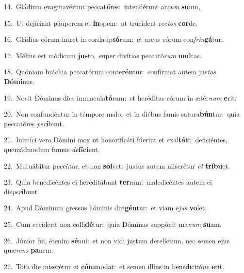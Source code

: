 {\numbfont\textcolor{\numbcolor}{14.}}~Gládium evaginavérunt pecca\-\textbf{tó}\-res:~\star intendérunt ar\textit{cum} \textbf{su}\-um,\par
{\numbfont\textcolor{\numbcolor}{15.}}~Ut dejíciant páuperem et \textbf{ín}\-opem:~\star ut trucídent rec\textit{tos} \textbf{cor}\-de.\par
{\numbfont\textcolor{\numbcolor}{16.}}~Gládius eórum intret in corda ip\-\textbf{só}\-rum:~\star et arcus eórum con\-\textit{frin}\-\textbf{gá}tur.\par
{\numbfont\textcolor{\numbcolor}{17.}}~Mélius est módicum \textbf{jus}\-to,~\star super divítias peccató\textit{rum} \textbf{mul}\-tas.\par
{\numbfont\textcolor{\numbcolor}{18.}}~Quóniam bráchia peccatórum conte\-\textbf{rén}\-tur:~\star confírmat autem jus\textit{tos} \textbf{Dó}\-\textbf{mi}nus.\par
{\numbfont\textcolor{\numbcolor}{19.}}~Novit Dóminus dies immacula\-\textbf{tó}\-rum:~\star et heréditas eórum in ætér\textit{num} \textbf{e}\-rit.\par
{\numbfont\textcolor{\numbcolor}{20.}}~Non confundéntur in témpore malo,~\dagger et in diébus famis satura\-\textbf{bún}\-tur:~\star quia peccatóres \textit{per}\-\textbf{í}bunt.\par
{\numbfont\textcolor{\numbcolor}{21.}}~Inimíci vero Dómini mox ut honorificáti fúerint et exal\-\textbf{tá}\-ti:~\star deficiéntes, quemádmodum fumus \textit{de}\-\textbf{fí}\textbf{ci}ent.\par
{\numbfont\textcolor{\numbcolor}{22.}}~Mutuábitur peccátor, et non \textbf{sol}\-vet:~\star justus autem miserétur \textit{et} \textbf{trí}\-\textbf{bu}et.\par
{\numbfont\textcolor{\numbcolor}{23.}}~Quia benedicéntes ei hereditábunt \textbf{ter}\-ram:~\star maledicéntes autem ei dis\-\textit{per}\-\textbf{í}bunt.\par
{\numbfont\textcolor{\numbcolor}{24.}}~Apud Dóminum gressus hóminis diri\-\textbf{gén}\-tur:~\star et viam e\textit{jus} \textbf{vo}\-let.\par
{\numbfont\textcolor{\numbcolor}{25.}}~Cum cecíderit non colli\-\textbf{dé}\-tur:~\star quia Dóminus suppónit ma\textit{num} \textbf{su}\-am.\par
{\numbfont\textcolor{\numbcolor}{26.}}~Júnior fui, étenim \textbf{sé}\-nui:~\star et non vidi justum derelíctum, nec semen ejus quæ\textit{rens} \textbf{pa}\-nem.\par
{\numbfont\textcolor{\numbcolor}{27.}}~Tota die miserétur et \textbf{cóm}\-modat:~\star et semen illíus in benedictió\textit{ne} \textbf{e}\-rit.\par
